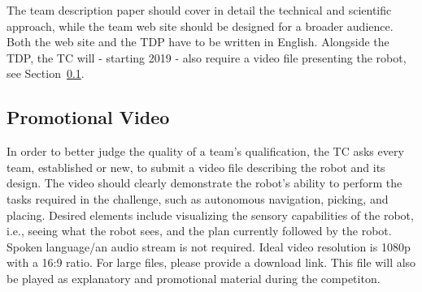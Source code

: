 The team description paper should cover in detail the technical and scientific approach, while the team web site should be designed for a broader audience. Both the web site and the TDP have to be written in English. Alongside the TDP, the TC will - starting 2019 - also require a video file presenting the robot, see Section~\ref{ssec:promotional_video}.

\subsection{Promotional Video}
\label{ssec:promotional_video}
In order to better judge the quality of a team's qualification, the TC asks every team, established or new, to submit a video file describing the robot and its design. The video should clearly demonstrate the robot's ability to perform the tasks required in the challenge, such as autonomous navigation, picking, and placing. Desired elements include visualizing the sensory capabilities of the robot, i.e., seeing what the robot sees, and the plan currently followed by the robot. Spoken language/an audio stream is not required. Ideal video resolution is 1080p with a 16:9 ratio. For large files, please provide a download link.
This file will also be played as explanatory and promotional material during the competiton.
